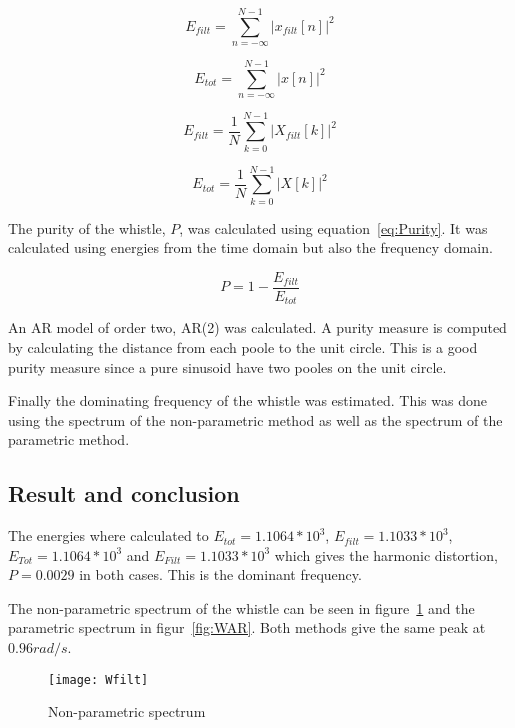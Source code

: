\documentclass[10pt]{article}
\begin{document}
\begin{equation}
  \label{eq:Etimefilt}
  E_{filt} =\sum\limits_{n=-\infty}^{N-1} |x_{filt}[n]|^2
\end{equation}

\begin{equation}
  \label{eq:Etime}
  E_{tot} =\sum\limits_{n=-\infty}^{N-1} |x[n]|^2
\end{equation}

\begin{equation}
  \label{eq:Efeqfilt}
  E_{filt} =\frac{1}{N}\sum\limits_{k=0}^{N-1} |X_{filt}[k]|^2
\end{equation}

\begin{equation}
  \label{eq:Efeq}
  E_{tot} =\frac{1}{N}\sum\limits_{k=0}^{N-1} |X[k]|^2
\end{equation}

The purity of the whistle, $P$, was calculated using equation~\ref{eq:Purity}.
It was calculated using energies from the time domain but also the
frequency domain.

\begin{equation}
  \label{eq:Purity}
  P =1-\frac{E_{filt}}{E_{tot}}
\end{equation}

An AR model of order two, AR(2) was calculated. A purity measure
is computed by calculating the distance from each poole to the unit
circle. This is a good purity measure since a pure sinusoid have
two pooles on the unit circle.

Finally the dominating frequency of the whistle was estimated.
This was done using the spectrum of the non-parametric method
as well as the spectrum of the parametric method.

\subsection{Result and conclusion}
The energies where calculated to $E_{tot}=1.1064*10^3$, $E_{filt}=1.1033*10^3$,
$E_{Tot}=1.1064*10^3$ and $E_{Filt}=1.1033*10^3$ which gives the harmonic distortion,
$P= 0.0029$ in both cases. This is the dominant frequency.

The non-parametric spectrum of the whistle can be seen in figure~\ref{fig:Wfilt}
and the parametric spectrum in figur~\ref{fig:WAR}. Both methods give the same peak
at $0.96 rad/s$.


\begin{figure}[!hp]

    \begin{center}
      \texttt{[image: Wfilt]}
    \caption{Non-parametric spectrum \label{fig:Wfilt}}
    \end{center}

\end{figure}
\end{document}
